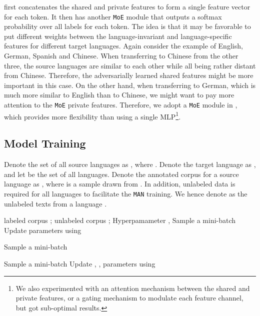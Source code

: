 \documentclass[11pt,a4paper]{article}
\newcommand{\manmoe}{\texttt{MAN-MoE}}
\newcommand{\man}{\texttt{MAN}}
\newcommand{\moe}{\texttt{MoE}}
\begin{document}
 first concatenates the shared and private features to form a single feature vector for each token.
It then has another \moe{} module that outputs a softmax probability over all labels for each token.
The idea is that it may be favorable to put different weights between the language-invariant and language-specific features for different target languages.
Again consider the example of English, German, Spanish and Chinese.
When transferring to Chinese from the other three, the source languages are similar to each other while all being rather distant from Chinese.
Therefore, the adversarially learned shared features might be more important in this case.
On the other hand, when transferring to German, which is much more similar to English than to Chinese, we might want to pay more attention to the \moe{} private features.
Therefore, we adopt a \moe{} module in , which provides more flexibility than using a single MLP\footnote{We also experimented with an attention mechanism between the shared and private features, or a gating mechanism to modulate each feature channel, but got sub-optimal results.}.
 \subsection{Model Training}\label{sec:training}
Denote the set of all  source languages as , where .
Denote the target language as , and let  be the set of all languages.
Denote the annotated corpus for a source language  as , where  is a sample drawn from .
In addition, unlabeled data is required for all languages to facilitate the \man{} training.
We hence denote as  the unlabeled texts from a language .

\begin{algorithm}[t]
\small
\begin{algorithmic}[1]
\Require
labeled corpus ; unlabeled corpus ; Hyperpamameter , 
\Repeat
{}
\State 
\ForAll{}
\State Sample a mini-batch 
\State  {}
\State  {}
\EndFor
\State Update  parameters using 
\EndFor

\State 
\ForAll{}
\State Sample a mini-batch 
\State  {}
\State  {}
\State 
\State  \EndFor

\ForAll{}
\State Sample a mini-batch 
\State  {}
\State  {}
\EndFor
\State Update , ,  parameters using 

\end{algorithmic}
\caption{\manmoe{} Training}
\label{alg:training}
\end{algorithm}
 
\end{document}
